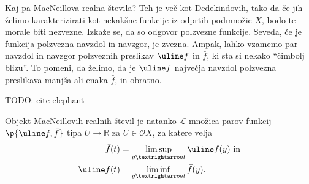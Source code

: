 Kaj pa MacNeillova realna števila? Teh je več kot Dedekindovih, tako da če jih
želimo karakterizirati kot nekakšne funkcije iz odprtih podmnožic \(X\), bodo te
morale biti nezvezne. Izkaže se, da so odgovor polzvezne funkcije. Seveda, če je
funkcija polzvezna navzdol in navzgor, je zvezna. Ampak, lahko vzamemo par
navzdol in navzgor polzveznih preslikav \(\uline f\) in \(\bar f\), ki sta si
nekako ``čimbolj blizu''. To pomeni, da želimo, da je \(\uline f\) največja
navzdol polzvezna preslikava manjša ali enaka \(\bar f\), in obratno.

TODO: cite elephant
\begin{trditev}\label{real:Rm-maps}
  Objekt MacNeillovih realnih števil je natanko \(ℒ\)-množica parov funkcij
  \(\p{\uline f, \bar f}\) tipa \(U → ℝ\) za \(U ∈ 𝒪X\), za katere velja
  \begin{align*}
    \bar   f(t) &=
    \limsup_{y → t}\uline f(y)\text{ in}\\
    \uline f(t) &=
    \liminf_{y → t}\bar   f(y)\text.
  \end{align*}
\end{trditev}
